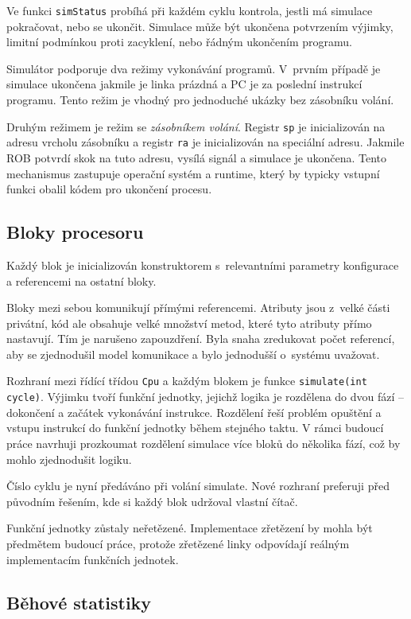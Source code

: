 Ve funkci \texttt{simStatus} probíhá při každém cyklu kontrola, jestli má simulace pokračovat, nebo se ukončit.
Simulace může být ukončena potvrzením výjimky, limitní podmínkou proti zacyklení, nebo řádným ukončením programu.

Simulátor podporuje dva režimy vykonávání programů.
V~prvním případě je simulace ukončena jakmile je linka prázdná a PC je za poslední instrukcí programu.
Tento režim je vhodný pro jednoduché ukázky bez zásobníku volání.

Druhým režimem je režim se \emph{zásobníkem volání}.
Registr \texttt{sp} je inicializován na adresu vrcholu zásobníku a registr \texttt{ra} je inicializován na 
speciální adresu.
Jakmile ROB potvrdí skok na tuto adresu, vysílá signál a simulace je ukončena.
Tento mechanismus zastupuje operační systém a runtime, který by typicky vstupní funkci obalil kódem pro ukončení procesu.

\subsection{Bloky procesoru}

Každý blok je inicializován konstruktorem s~relevantními parametry konfigurace a referencemi na ostatní bloky.

Bloky mezi sebou komunikují přímými referencemi.
Atributy jsou z~velké části privátní, kód ale obsahuje velké množství metod, které tyto atributy přímo nastavují.
Tím je narušeno zapouzdření.
Byla snaha zredukovat počet referencí, aby se zjednodušil model komunikace a bylo jednodušší o~systému uvažovat.

Rozhraní mezi řídící třídou \texttt{Cpu} a každým blokem je funkce \texttt{simulate(int cycle)}.
Výjimku tvoří funkční jednotky, jejichž logika je rozdělena do dvou fází -- dokončení a začátek vykonávání instrukce.
Rozdělení řeší problém opuštění a vstupu instrukcí do funkční jednotky během stejného taktu.
V rámci budoucí práce navrhuji prozkoumat rozdělení simulace více bloků do několika fází, což by mohlo zjednodušit logiku.

Číslo cyklu je nyní předáváno při volání simulate.
Nové rozhraní preferuji před původním řešením, kde si každý blok udržoval vlastní čítač.

Funkční jednotky zůstaly neřetězené.
Implementace zřetězení by mohla být předmětem budoucí práce, protože zřetězené linky odpovídají reálným implementacím funkčních jednotek.

\subsection{Běhové statistiky}

